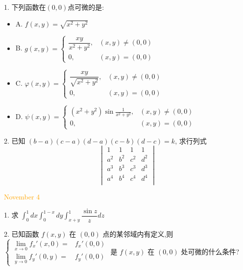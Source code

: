 1. 下列函数在$(0,0)$点可微的是:
\begin{itemize}
	\item A. $f(x,y)=\sqrt{x^2+y^2}$
	\item B. $g(x,y)=
	\begin{cases}
		\dfrac{xy}{x^2+y^2}, &(x,y)\neq (0,0)\\
		0, &(x,y)=(0,0)
	\end{cases}$
	\item C. $\varphi(x,y)=
	\begin{cases}
		\dfrac{xy}{\sqrt{x^2+y^2}}, &(x,y)\neq (0,0)\\
		0, &(x,y)=(0,0)
	\end{cases}$
	\item D. $\psi(x,y)=
	\begin{cases}
		(x^2+y^2)\sin\frac{1}{x^2+y^2}, &(x,y)\neq (0,0)\\
		0, &(x,y)=(0,0)
	\end{cases}$
\end{itemize}
\begin{solution}
	
\end{solution}

2. 已知 $(b-a)(c-a)(d-a)(c-b)(d-c)=k$, 求行列式
$$\begin{vmatrix}
	  1   &   1   &  1    &  1    \\
	a^{2} & b^{2} & c^{2} & d^{2} \\
	a^{3} & b^{3} & c^{3} & d^{3} \\
	a^{4} & b^{4} & c^{4} & d^{4} \\
\end{vmatrix}$$
\begin{solution}
	
\end{solution}

\textcolor{orange}{November 4}

1. 求 $\displaystyle{\int_{0}^{1}dx\int_{0}^{1-x}dy\int_{x+y}^{1}\dfrac{\sin z}{z}dz}$
\begin{solution}
	
\end{solution}

2. 已知函数 $f(x,y)$ 在 $(0,0)$ 点的某邻域内有定义,则 
$\begin{cases}
	\lim\limits_{x\to 0}f_{x}'(x,0)  = & f_{x}'(0,0)\\
	\lim\limits_{y\to 0}f_{y}'(0,y)  = & f_{y}'(0,0)
\end{cases}$ 是 $f(x,y)$ 在 $(0,0)$ 处可微的什么条件?
\begin{solution}
	
\end{solution}

